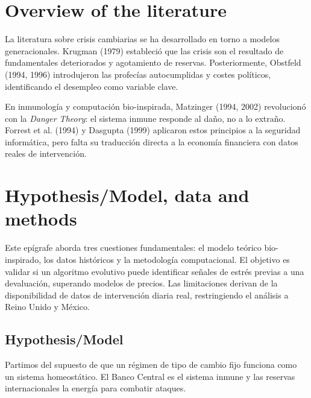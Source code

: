 \section{Overview of the literature}

La literatura sobre crisis cambiarias se ha desarrollado en torno a modelos generacionales. Krugman (1979)\cite{krugman1979} estableció que las crisis son el resultado de fundamentales deteriorados y agotamiento de reservas. Posteriormente, Obstfeld (1994, 1996)\cite{obstfeld1994,obstfeld1996} introdujeron las profecías autocumplidas y costes políticos, identificando el desempleo como variable clave.

En inmunología y computación bio-inspirada, Matzinger (1994, 2002)\cite{matzinger1994,matzinger2002} revolucionó con la \textit{Danger Theory}: el sistema inmune responde al daño, no a lo extraño. Forrest et al. (1994)\cite{forrest1994} y Dasgupta (1999)\cite{dasgupta1999} aplicaron estos principios a la seguridad informática, pero falta su traducción directa a la economía financiera con datos reales de intervención.

\section{Hypothesis/Model, data and methods}

Este epígrafe aborda tres cuestiones fundamentales: el modelo teórico bio-inspirado, los datos históricos y la metodología computacional. El objetivo es validar si un algoritmo evolutivo puede identificar señales de estrés previas a una devaluación, superando modelos de precios. Las limitaciones derivan de la disponibilidad de datos de intervención diaria real, restringiendo el análisis a Reino Unido y México.

\subsection{Hypothesis/Model}

Partimos del supuesto de que un régimen de tipo de cambio fijo funciona como un sistema homeostático. El Banco Central es el sistema inmune y las reservas internacionales la energía para combatir ataques.

